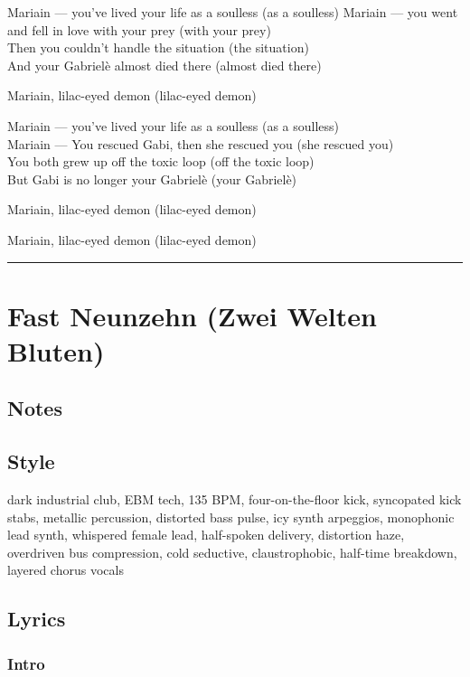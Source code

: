 Mariain --- you've lived your life as a soulless (as a soulless) Mariain
--- you went and fell in love with your prey (with your prey)\\
Then you couldn't handle the situation (the situation)\\
And your Gabrielè almost died there (almost died there)

Mariain, lilac-eyed demon (lilac-eyed demon)

Mariain --- you've lived your life as a soulless (as a soulless)\\
Mariain --- You rescued Gabi, then she rescued you (she rescued you)\\
You both grew up off the toxic loop (off the toxic loop)\\
But Gabi is no longer your Gabrielè (your Gabrielè)

Mariain, lilac-eyed demon (lilac-eyed demon)

Mariain, lilac-eyed demon (lilac-eyed demon)

\begin{center}\rule{0.5\linewidth}{0.5pt}\end{center}

\section{Fast Neunzehn (Zwei Welten
Bluten)}\label{fast-neunzehn-zwei-welten-bluten}

\subsection{Notes}\label{notes-32}

\subsection{Style}\label{style-31}

dark industrial club, EBM tech, 135 BPM, four-on-the-floor kick,
syncopated kick stabs, metallic percussion, distorted bass pulse, icy
synth arpeggios, monophonic lead synth, whispered female lead,
half-spoken delivery, distortion haze, overdriven bus compression, cold
seductive, claustrophobic, half-time breakdown, layered chorus vocals

\subsection{Lyrics}\label{lyrics-31}

\subsubsection{Intro}\label{intro-1}

